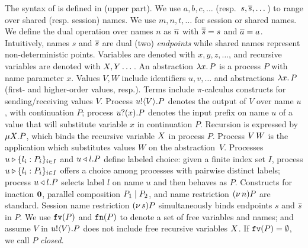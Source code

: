 \noindent{} 
The syntax of \HOp is defined in  (upper part).
We use $a,b,c, \dots$ (resp.~$s, \overline{s}, \dots$) 
to range over shared (resp. session) names. 
We use $m, n, t, \dots$ for session or shared names. 
We define the dual operation over names $n$ as $\overline{n}$ with
$\overline{\overline{s}} = s$ and $\overline{a} = a$.
Intuitively, names $s$ and $\overline{s}$ are dual (two) \emph{endpoints} while 
shared names represent non-deterministic points. 
Variables are denoted with $x, y, z, \dots$, 
and recursive variables are denoted with $X, Y \dots$.
An abstraction %
$\lambda x.\,P$ is a process $P$ with name parameter $x$.
Values $V,W$ include 
identifiers $u, v, \ldots$ %
and 
abstractions $\lambda x.\,P$ (first- and higher-order values, resp.). 
{Terms} 
include $\pi$-calculus constructs for sending/receiving values $V$.
Process $u ! \langle V \rangle . P$ denotes the output of   $V$
over name $u$, with continuation $P$;
process $u ? (x) . P$ denotes the input prefix on name $u$ of a value
that 
will substitute variable $x$ in continuation $P$. 
Recursion is expressed by $\mu X. P$,
which binds the recursive variable $X$ in process $P$.
Process 
$V\, {W}$ 
is the application
which substitutes values $W$ on the abstraction~$V$. 
Processes $u \triangleright \{l_i: P_i\}_{i \in I}$  and $u \triangleleft l . P$ define labeled choice:
given a finite index set $I$, process $u \triangleright \{l_i: P_i\}_{i \in I}$ offers a choice 
among processes with pairwise distinct labels;
 process $u \triangleleft l . P$ selects label $l$ on name $u$ and then behaves as $P$.
Constructs for 
inaction $\mathbf{0}$,  parallel composition $P_1 \;|\; P_2$, and 
name restriction $(\nu\, n) P$ are standard.
Session name restriction $(\nu\, s) P$ simultaneously binds endpoints $s$ and $\overline{s}$ in $P$.
We use $\mathtt{fv}(P)$ and $\mathtt{fn}(P)$ to denote a set of free 
variables and names; 
and assume $V$ in $u ! \langle V \rangle .{P}$ does not include free recursive 
variables $X$. 
If $\mathtt{fv}(P) = \emptyset$, we call $P$ {\em closed}.

